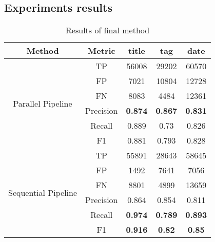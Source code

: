 \subsection{Experiments results}
\begin{table}
\centering
\caption{Results of final method}
\begin{tabular}{c|c|*3c}
    \toprule
        Method                  &     Metric     & title    & tag       &  date        \\
        
        \midrule
\multirow{6}{*}{Parallel Pipeline}             & TP & 56008    & 29202     & 60570        \\
                                                & FP & 7021     & 10804     & 12728       \\
                                                & FN & 8083     & 4484      & 12361       \\
                                                \cmidrule(lr){2-5}
                                                & Precision & \textbf{0.874}     & \textbf{0.867}     & \textbf{0.831}  \\
                                                & Recall    & 0.889     & 0.73      & 0.826  \\
                                                & F1        & 0.881     & 0.793     & 0.828  \\
        
        \midrule
\multirow{6}{*}{Sequential Pipeline}            & TP & 55891    & 28643     & 58645           \\
                                                & FP & 1492     & 7641      & 7056            \\
                                                & FN & 8801     & 4899      & 13659           \\
                                                \cmidrule(lr){2-5}
                                                & Precision & 0.864     & 0.854     & 0.811  \\
                                                & Recall    & \textbf{0.974}     & \textbf{0.789}     & \textbf{0.893}  \\
                                                & F1        & \textbf{0.916}     & \textbf{0.82}      & \textbf{0.85}   \\
    \bottomrule
\end{tabular}
\label{tab:final_experiments_results}
\end{table}

